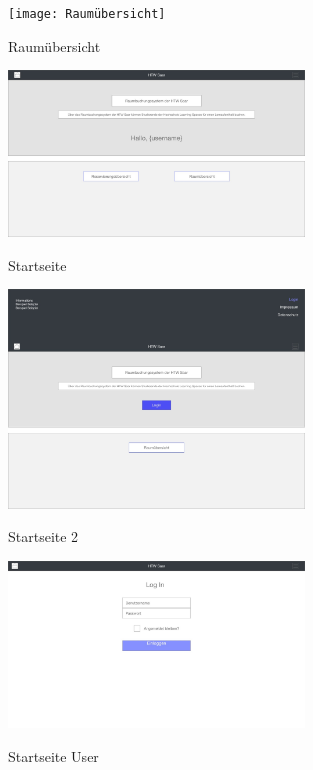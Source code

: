 \documentclass[a4paper,report,headsepline]{scrreprt}
\begin{document}
\begin{figure}[h]
    \centering
    \caption{Raumübersicht}
    \texttt{[image: Raumübersicht]}
    \label{fig:raumbuchung}
\end{figure}

\begin{figure}[h]
    \centering
    \caption{Startseite}
    \includegraphics[width=0.7\textwidth]{Startseite}
    \label{fig:raumbuchung}
\end{figure}

\begin{figure}[h]
    \centering
    \caption{Startseite 2}
    \includegraphics[width=0.7\textwidth]{Startseite 2}
    \label{fig:raumbuchung}
\end{figure}

\begin{figure}[h]
    \centering
    \caption{Startseite User}
    \includegraphics[width=0.7\textwidth]{Startseite User}
    \label{fig:raumbuchung}
\end{figure}
\end{document}
